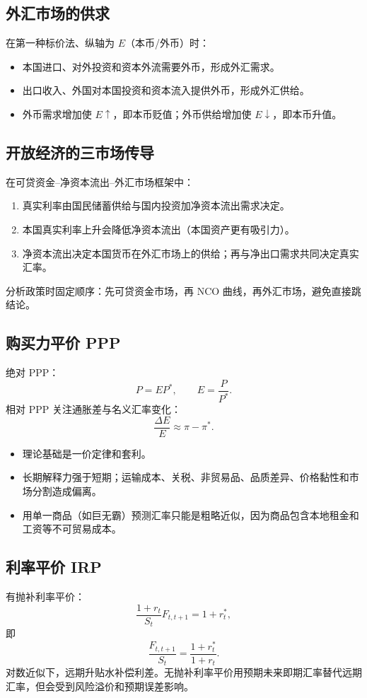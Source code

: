 \documentclass[UTF8,11pt,a4paper]{ctexart}
\begin{document}
\subsection{外汇市场的供求}
在第一种标价法、纵轴为 $E$（本币/外币）时：
\begin{itemize}
  \item 本国进口、对外投资和资本外流需要外币，形成外汇需求。
  \item 出口收入、外国对本国投资和资本流入提供外币，形成外汇供给。
  \item 外币需求增加使 $E\uparrow$，即本币贬值；外币供给增加使 $E\downarrow$，即本币升值。
\end{itemize}

\subsection{开放经济的三市场传导}
在可贷资金--净资本流出--外汇市场框架中：
\begin{enumerate}
  \item 真实利率由国民储蓄供给与国内投资加净资本流出需求决定。
  \item 本国真实利率上升会降低净资本流出（本国资产更有吸引力）。
  \item 净资本流出决定本国货币在外汇市场上的供给；再与净出口需求共同决定真实汇率。
\end{enumerate}
分析政策时固定顺序：先可贷资金市场，再 NCO 曲线，再外汇市场，避免直接跳结论。

\subsection{购买力平价 PPP}
绝对 PPP：
\[
P=EP^*,
\qquad E=\frac{P}{P^*}.
\]
相对 PPP 关注通胀差与名义汇率变化：
\[
\frac{\Delta E}{E}\approx\pi-\pi^*.
\]
\begin{itemize}
  \item 理论基础是一价定律和套利。
  \item 长期解释力强于短期；运输成本、关税、非贸易品、品质差异、价格黏性和市场分割造成偏离。
  \item 用单一商品（如巨无霸）预测汇率只能是粗略近似，因为商品包含本地租金和工资等不可贸易成本。
\end{itemize}

\subsection{利率平价 IRP}
有抛补利率平价：
\[
\frac{1+r_t}{S_t}F_{t,t+1}=1+r_t^*,
\]
即
\[
\frac{F_{t,t+1}}{S_t}=\frac{1+r_t^*}{1+r_t}.
\]
对数近似下，远期升贴水补偿利差。无抛补利率平价用预期未来即期汇率替代远期汇率，但会受到风险溢价和预期误差影响。
\end{document}
